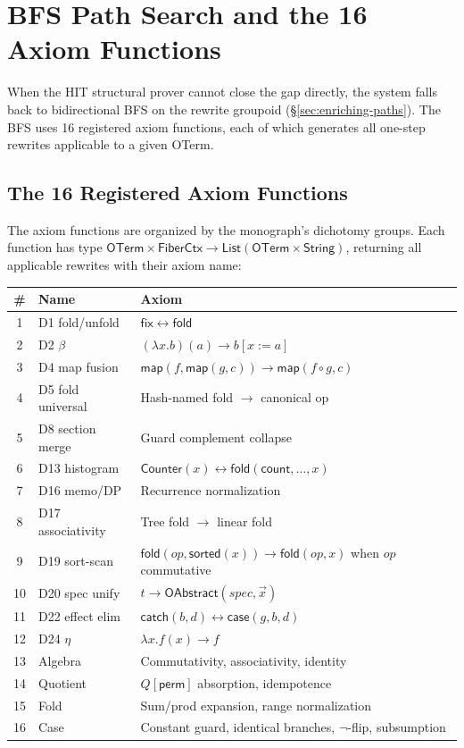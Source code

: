 \documentclass[11pt,a4paper]{report}
\theoremstyle{definition}
\theoremstyle{plain}
\newcommand{\fold}{\mathsf{fold}}
\begin{document}
\section{BFS Path Search and the 16 Axiom Functions}
\label{sec:bfs-axioms}

When the HIT structural prover cannot close the gap directly,
the system falls back to bidirectional BFS on the rewrite
groupoid (\S\ref{sec:enriching-paths}).  The BFS uses 16
registered axiom functions, each of which generates all
one-step rewrites applicable to a given OTerm.

\subsection{The 16 Registered Axiom Functions}

The axiom functions are organized by the monograph's dichotomy
groups.  Each function has type
$\mathsf{OTerm} \times \mathsf{FiberCtx} \to
\mathsf{List}(\mathsf{OTerm} \times \mathsf{String})$,
returning all applicable rewrites with their axiom name:

\begin{center}
\begin{tabular}{clp{5.5cm}}
\hline
\textbf{\#} & \textbf{Name} & \textbf{Axiom} \\
\hline
1 & D1 fold/unfold & $\mathsf{fix} \leftrightarrow \fold$ \\
2 & D2 $\beta$ & $(\lambda x.b)(a) \to b[x := a]$ \\
3 & D4 map fusion & $\mathsf{map}(f, \mathsf{map}(g, c)) \to \mathsf{map}(f \circ g, c)$ \\
4 & D5 fold universal & Hash-named fold $\to$ canonical op \\
5 & D8 section merge & Guard complement collapse \\
6 & D13 histogram & $\mathsf{Counter}(x) \leftrightarrow \fold(\mathsf{count}, \ldots, x)$ \\
7 & D16 memo/DP & Recurrence normalization \\
8 & D17 associativity & Tree fold $\to$ linear fold \\
9 & D19 sort-scan & $\fold(\mathit{op}, \mathsf{sorted}(x)) \to \fold(\mathit{op}, x)$ when $\mathit{op}$ commutative \\
10 & D20 spec unify & $t \to \mathsf{OAbstract}(\mathit{spec}, \vec{x})$ \\
11 & D22 effect elim & $\mathsf{catch}(b, d) \leftrightarrow \mathsf{case}(g, b, d)$ \\
12 & D24 $\eta$ & $\lambda x.f(x) \to f$ \\
13 & Algebra & Commutativity, associativity, identity \\
14 & Quotient & $Q[\mathsf{perm}]$ absorption, idempotence \\
15 & Fold & Sum/prod expansion, range normalization \\
16 & Case & Constant guard, identical branches, $\lnot$-flip, subsumption \\
\hline
\end{tabular}
\end{center}
\end{document}
